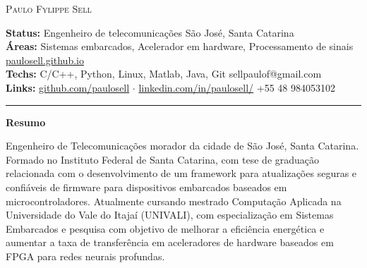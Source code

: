 \documentclass[10pt,A4]{article}
\newcommand{\sectionspace}{
	\vspace{0.1cm}
}
\newcommand{\cvsection}[1]
{
	\begin{center}
		\large\textcolor{sectcol}{\textbf{#1}}
	\end{center}
	\sectionspace
}
\newcommand{\metasection}[2]
{
\footnotesize{#2} \hspace*{\fill} \footnotesize{#1}\\[1pt]
}
\begin{document}
\pagestyle{fancy}	








\vspace{-8pt}
\begin{center}
	\HUGE \textsc{Paulo Fylippe Sell} \\[2pt]
\end{center}



\vspace{6pt}


\metasection{São José, Santa Catarina}{\textbf{Status:} Engenheiro de telecomunicações}
\metasection{\href{https://paulosell.github.io}{paulosell.github.io}}{\textbf{Áreas:} 
Sistemas embarcados, Acelerador em hardware, Processamento de sinais}
\metasection{sellpaulof@gmail.com}{\textbf{Techs:} C/C++, Python, Linux, Matlab, Java, Git}
\metasection{+55 48 984053102}{\textbf{Links:} \href{https://github.com/paulosell}{github.com/paulosell} $\cdot$ \href{https://www.linkedin.com/in/paulosell/}{linkedin.com/in/paulosell/}} 
\vspace{-2pt}
\textcolor{softcol}{\hrule}
\vspace{6pt}

\normalsize

\vspace{-6pt}
\cvsection{Resumo}
Engenheiro de Telecomunicações morador da cidade de São José, Santa Catarina. Formado no Instituto Federal de Santa Catarina, com tese de graduação relacionada com o desenvolvimento de um framework para atualizações seguras e confiáveis de firmware para dispositivos embarcados baseados em microcontroladores. Atualmente cursando mestrado Computação Aplicada na Universidade do Vale do Itajaí (UNIVALI), com especialização em Sistemas Embarcados e pesquisa com objetivo de melhorar a eficiência energética e aumentar a taxa de transferência em aceleradores de hardware baseados em FPGA para redes neurais profundas.\\
\end{document}
